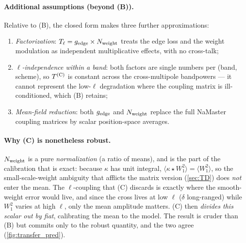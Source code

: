 \documentclass[11pt]{article}
\newcommand{\Wone}{W_1}
\newcommand{\dt}{\delta}
\begin{document}
\paragraph{Additional assumptions (beyond (B)).}
Relative to (B), the closed form makes three further approximations:
\begin{enumerate}
\item \emph{Factorization}: $T_\ell=g_{\rm edge}\times N_{\rm weight}$ treats the
edge loss and the weight modulation as independent multiplicative effects, with
no cross-talk;
\item \emph{$\ell$-independence within a band}: both factors are single numbers
per (band, scheme), so $T^{\rm (C)}$ is constant across the cross-multipole
bandpowers --- it cannot represent the low-$\ell$ degradation where the coupling
matrix is ill-conditioned, which (B) retains;
\item \emph{Mean-field reduction}: both $g_{\rm edge}$ and $N_{\rm weight}$
replace the full NaMaster coupling matrices by scalar position-space averages.
\end{enumerate}

\paragraph{Why (C) is nonetheless robust.}
$N_{\rm weight}$ is a pure \emph{normalization} (a ratio of means), and is the
part of the calibration that is exact: because $\kappa$ has unit integral,
$\langle\kappa\star\Wone^2\rangle=\langle\Wone^2\rangle$, so the
small-scale-weight ambiguity that afflicts the matrix version (\cref{sec:TD}) does
\emph{not} enter the mean. The $\ell$-coupling that (C) discards is exactly where
the smooth-weight error would live, and since the cross lives at low $\ell$
($\dt$ long-ranged) while $\Wone^2$ varies at high $\ell$, only the mean
amplitude matters. (C) then \emph{divides this scalar out by fiat}, calibrating
the mean to the model. The result is cruder than (B) but commits only to the
robust quantity, and the two agree (\cref{fig:transfer_pred}).
\end{document}
